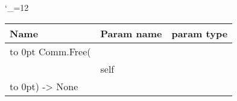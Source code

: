\begingroup \catcode`\_=12 \tt
\begin{tabular}{lll}
\toprule
\textrm{Name}&\textrm{Param name}&\textrm{param type}\\
\midrule
\hbox to 0pt {Comm.Free(\hss}\\
& self\\
\hbox to 0pt{) -> None\hss}\\
\bottomrule
\end{tabular}
\endgroup
